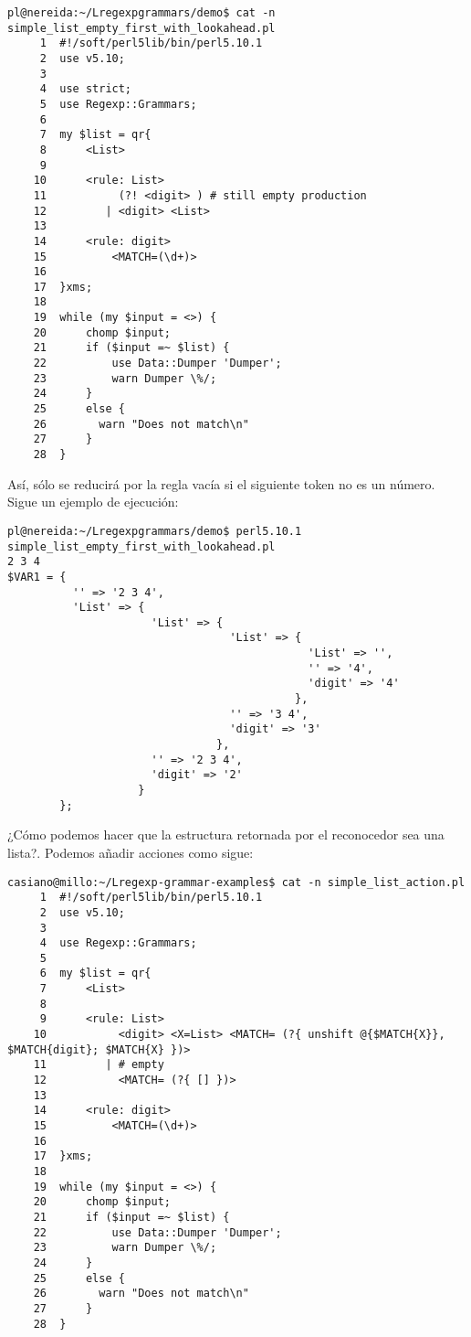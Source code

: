 \begin{verbatim}
pl@nereida:~/Lregexpgrammars/demo$ cat -n simple_list_empty_first_with_lookahead.pl
     1  #!/soft/perl5lib/bin/perl5.10.1
     2  use v5.10;
     3
     4  use strict;
     5  use Regexp::Grammars;
     6
     7  my $list = qr{
     8      <List>
     9
    10      <rule: List>
    11           (?! <digit> ) # still empty production
    12         | <digit> <List>
    13
    14      <rule: digit>
    15          <MATCH=(\d+)>
    16
    17  }xms;
    18
    19  while (my $input = <>) {
    20      chomp $input;
    21      if ($input =~ $list) {
    22          use Data::Dumper 'Dumper';
    23          warn Dumper \%/;
    24      }
    25      else {
    26        warn "Does not match\n"
    27      }
    28  }
\end{verbatim}
Así, sólo se reducirá por la regla vacía si el siguiente token no es un
número. Sigue un ejemplo de ejecución:
\begin{verbatim}
pl@nereida:~/Lregexpgrammars/demo$ perl5.10.1 simple_list_empty_first_with_lookahead.pl
2 3 4
$VAR1 = {
          '' => '2 3 4',
          'List' => {
                      'List' => {
                                  'List' => {
                                              'List' => '',
                                              '' => '4',
                                              'digit' => '4'
                                            },
                                  '' => '3 4',
                                  'digit' => '3'
                                },
                      '' => '2 3 4',
                      'digit' => '2'
                    }
        };

\end{verbatim}


¿Cómo podemos hacer que la estructura retornada por el reconocedor 
sea una lista?. Podemos añadir acciones como sigue:

\begin{verbatim}
casiano@millo:~/Lregexp-grammar-examples$ cat -n simple_list_action.pl
     1  #!/soft/perl5lib/bin/perl5.10.1
     2  use v5.10;
     3
     4  use Regexp::Grammars;
     5
     6  my $list = qr{
     7      <List>
     8
     9      <rule: List>
    10           <digit> <X=List> <MATCH= (?{ unshift @{$MATCH{X}}, $MATCH{digit}; $MATCH{X} })>
    11         | # empty
    12           <MATCH= (?{ [] })>
    13
    14      <rule: digit>
    15          <MATCH=(\d+)>
    16
    17  }xms;
    18
    19  while (my $input = <>) {
    20      chomp $input;
    21      if ($input =~ $list) {
    22          use Data::Dumper 'Dumper';
    23          warn Dumper \%/;
    24      }
    25      else {
    26        warn "Does not match\n"
    27      }
    28  }
\end{verbatim}

